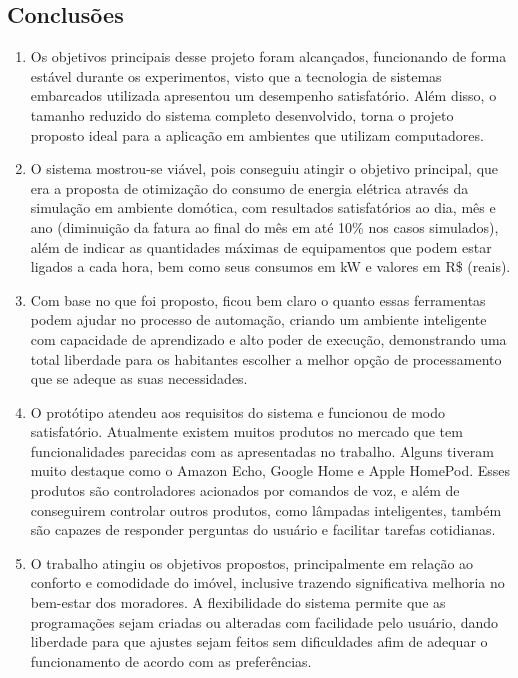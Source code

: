 \documentclass[10pt,brazil,english]{article}
\begin{document}
\subsection{Conclusões}
\begin{enumerate}
\item Os objetivos principais desse projeto foram alcançados, funcionando de forma estável durante os experimentos, visto que a tecnologia de sistemas embarcados utilizada apresentou um desempenho satisfatório. Além disso, o tamanho reduzido do sistema completo desenvolvido, torna o projeto proposto ideal para a aplicação em ambientes que utilizam computadores.
\item O sistema mostrou-se viável, pois conseguiu atingir o objetivo principal, que era a proposta de otimização do consumo de energia elétrica através da simulação em ambiente domótica, com resultados satisfatórios ao dia, mês e ano (diminuição da fatura ao final do mês em até 10\% nos casos simulados), além de indicar as quantidades máximas de equipamentos que podem estar ligados a cada hora, bem como seus consumos em kW e valores em R\$ (reais). 
\item Com base no que foi proposto, ficou bem claro o quanto essas ferramentas podem ajudar no processo de automação, criando um ambiente inteligente com capacidade de aprendizado e alto poder de execução, demonstrando uma total liberdade para os habitantes escolher a melhor opção de processamento que se adeque as suas necessidades. 
\item O protótipo atendeu aos requisitos do sistema e funcionou de modo satisfatório. Atualmente existem muitos produtos no mercado que tem funcionalidades parecidas com as apresentadas no trabalho. Alguns tiveram muito destaque como o Amazon Echo, Google Home e Apple HomePod. Esses produtos são controladores acionados por comandos de voz, e além de conseguirem controlar outros produtos, como lâmpadas inteligentes, também são capazes de responder perguntas do usuário e facilitar tarefas cotidianas. 
\item O trabalho atingiu os objetivos propostos, principalmente em relação ao conforto e comodidade do imóvel, inclusive trazendo significativa melhoria no bem-estar dos moradores. A flexibilidade do sistema permite que as programações sejam criadas ou alteradas com facilidade pelo usuário, dando liberdade para que ajustes sejam feitos sem dificuldades afim de adequar o funcionamento de acordo com as preferências. 
\end{enumerate}
\end{document}
